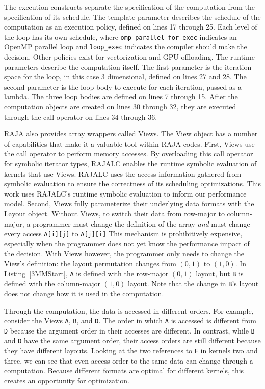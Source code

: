 \documentclass[sigconf,review=true]{acmart}
\begin{document}
The execution constructs separate the specification of the computation from the specification of its schedule.
The template parameter describes the schedule of the computation as an execution policy, defined on lines 17 through 25.
Each level of the loop has its own schedule, where \verb.omp_parallel_for_exec. indicates an OpenMP parallel loop and \verb.loop_exec. indicates the compiler should make the decision.
Other policies exist for vectorization and GPU-offloading.
The runtime parameters describe the computation itself. 
The first parameter is the iteration space for the loop, in this case 3 dimensional, defined on lines 27 and 28. 
The second parameter is the loop body to execute for each iteration, passed as a lambda.
The three loop bodies are defined on lines 7 through 15.
After the computation objects are created on lines 30 through 32, they are executed through the call operator on lines 34 through 36.

RAJA also provides array wrappers called Views.
The View object has a number of capabilities that make it a valuable tool within RAJA codes.
First, Views use the call operator to perform memory accesses. 
By overloading this call operator for symbolic iterator types, RAJALC enables the runtime symbolic evaluation of kernels that use Views.
RAJALC uses the access information gathered from symbolic evaluation to ensure the correctness of its scheduling optimizations.
This work uses RAJALC's runtime symbolic evaluation to inform our performance model.
Second, Views fully parameterize their underlying data formats with the Layout object.
Without Views, to switch their data from row-major to column-major, a programmer must change the definition of the array \textit{and} must change every access \verb.A[i][j]. to \verb.A[j][i].
This mechanism is prohibitively expensive, especially when the programmer does not yet know the performance impact of the decision.
With Views however, the programmer only needs to change the View's definition: the layout permutation changes from $(0,1)$ to $(1,0)$. 
In Listing~\ref{3MMStart}, \verb.A. is defined with the row-major $(0,1)$ layout, but \verb.B. is defined with the column-major $(1,0)$ layout. 
Note that the change in \verb.B.'s layout does not change how it is used in the computation. 

Through the computation, the data is accessed in different orders.
For example, consider the Views \verb.A., \verb.B., and \verb.D..
The order in which \verb.A. is accessed is different from \verb.D. because the argument order in their accesses are different.
In contrast, while \verb.B. and \verb.D. have the same argument order, their access orders are still different because they have different layouts.
Looking at the two references to \verb.F. in kernels two and three, we can see that even access order to the same data can change through a computation.
Because different formats are optimal for different kernels, this creates an opportunity for optimization. 
\end{document}
